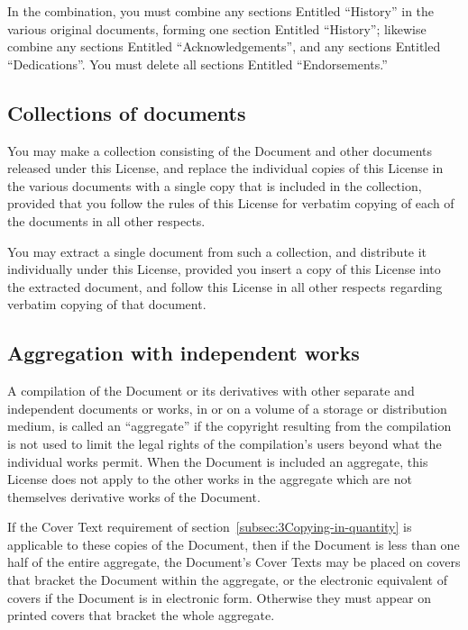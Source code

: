 {\tiny{}In the combination, you must combine any sections Entitled
\textquotedblleft History\textquotedblright{} in the various original
documents, forming one section Entitled \textquotedblleft History\textquotedblright ;
likewise combine any sections Entitled \textquotedblleft Acknowledgements\textquotedblright ,
and any sections Entitled \textquotedblleft Dedications\textquotedblright .
You must delete all sections Entitled \textquotedblleft Endorsements.\textquotedblright{}}{\tiny\par}

\subsection*{{\tiny{}Collections of documents}}

{\tiny{}You may make a collection consisting of the Document and other
documents released under this License, and replace the individual
copies of this License in the various documents with a single copy
that is included in the collection, provided that you follow the rules
of this License for verbatim copying of each of the documents in all
other respects.}{\tiny\par}

{\tiny{}You may extract a single document from such a collection,
and distribute it individually under this License, provided you insert
a copy of this License into the extracted document, and follow this
License in all other respects regarding verbatim copying of that document.}{\tiny\par}

\subsection*{{\tiny{}Aggregation with independent works}}

{\tiny{}A compilation of the Document or its derivatives with other
separate and independent documents or works, in or on a volume of
a storage or distribution medium, is called an \textquotedblleft aggregate\textquotedblright{}
if the copyright resulting from the compilation is not used to limit
the legal rights of the compilation\textsf{'}s users beyond what the individual
works permit. When the Document is included an aggregate, this License
does not apply to the other works in the aggregate which are not themselves
derivative works of the Document.}{\tiny\par}

{\tiny{}If the Cover Text requirement of section~\ref{subsec:3Copying-in-quantity}
is applicable to these copies of the Document, then if the Document
is less than one half of the entire aggregate, the Document\textsf{'}s Cover
Texts may be placed on covers that bracket the Document within the
aggregate, or the electronic equivalent of covers if the Document
is in electronic form. Otherwise they must appear on printed covers
that bracket the whole aggregate.}{\tiny\par}

